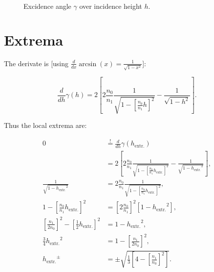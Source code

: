 \documentclass[pagesize=pdftex,paper=a4,fontsize=12pt]{scrartcl}
\begin{document}
\begin{figure}[H]
	\centering
	\caption{Excidence angle $\gamma$ over incidence height $h$.}
	\label{fig:GammaOverH}
\end{figure}

\pagebreak

\section{Extrema}

The derivate is [using $\frac{d}{dx} \arcsin(x) = \frac{1}{\sqrt{1-x^2}}$]:

\[ \frac{d}{dh} \gamma (h) = 2 \left[2 \frac{n_0}{n_1} \frac{1}{\sqrt{1-[\frac{n_0}{n_1} h]^2}} - \frac{1}{\sqrt{1-h^2}}\right]. \]

Thus the local extrema are:

\newcommand{\hExtremum}{\ensuremath{h_{\text{extr.}}}}
\newcommand{\gammaExtremum}{\ensuremath{\gamma_{\text{extr.}}}}
\begin{align}
	0 & \stackrel{!}{=} \frac{d}{dh} \gamma (\hExtremum)\\
 & = 2 \left[2 \frac{n_0}{n_1} \frac{1}{\sqrt{1-[\frac{n_0}{n_1} \hExtremum]^2}} - \frac{1}{\sqrt{1-\hExtremum^2}}\right], \nonumber \\[.5em]
	\frac{1}{\sqrt{1-\hExtremum^2}} &= 2 \frac{n_0}{n_1} \frac{1}{\sqrt{1-[\frac{n_0}{n_1} \hExtremum]^2}}, \nonumber \\[.5em]
	1-\left[\frac{n_0}{n_1} \hExtremum\right]^2 &= \left[2 \frac{n_0}{n_1}\right]^2 \left[1-\hExtremum^2\right], \nonumber \\[.5em]
	\left[\frac{n_1}{2 n_0}\right]^2 -\left[\frac{1}{2} \hExtremum\right]^2 &=  1-\hExtremum^2, \nonumber \\[.5em]
	\frac{3}{4} \hExtremum^2 &=  1 - \left[\frac{n_1}{2 n_0}\right]^2, \nonumber \\[.5em]
	\hExtremum^{\pm} &= \pm \sqrt{\frac{1}{3} \left[4 - \left[\frac{n_1}{n_0}\right]^2\right]}.
\end{align}
\end{document}
